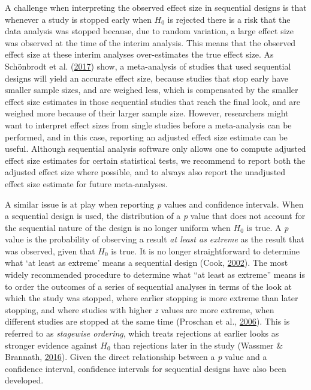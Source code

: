 \documentclass[
  english,
  ,jou, a4paper,floatsintext]{apa6}
\begin{document}
A challenge when interpreting the observed effect size in sequential designs is that whenever a study is stopped early when \(H_0\) is rejected there is a risk that the data analysis was stopped because, due to random variation, a large effect size was observed at the time of the interim analysis. This means that the observed effect size at these interim analyses over-estimates the true effect size. As Schönbrodt et al. (\protect\hyperlink{ref-schonbrodt_sequential_2017}{2017}) show, a meta-analysis of studies that used sequential designs will yield an accurate effect size, because studies that stop early have smaller sample sizes, and are weighed less, which is compensated by the smaller effect size estimates in those sequential studies that reach the final look, and are weighed more because of their larger sample size. However, researchers might want to interpret effect sizes from single studies before a meta-analysis can be performed, and in this case, reporting an adjusted effect size estimate can be useful. Although sequential analysis software only allows one to compute adjusted effect size estimates for certain statistical tests, we recommend to report both the adjusted effect size where possible, and to always also report the unadjusted effect size estimate for future meta-analyses.

A similar issue is at play when reporting \emph{p} values and confidence intervals. When a sequential design is used, the distribution of a \emph{p} value that does not account for the sequential nature of the design is no longer uniform when \(H_0\) is true. A \emph{p} value is the probability of observing a result \emph{at least as extreme} as the result that was observed, given that \(H_0\) is true. It is no longer straightforward to determine what `at least as extreme' means a sequential design (Cook, \protect\hyperlink{ref-cook_p-value_2002}{2002}). The most widely recommended procedure to determine what ``at least as extreme'' means is to order the outcomes of a series of sequential analyses in terms of the look at which the study was stopped, where earlier stopping is more extreme than later stopping, and where studies with higher \emph{z} values are more extreme, when different studies are stopped at the same time (Proschan et al., \protect\hyperlink{ref-proschan_statistical_2006}{2006}). This is referred to as \emph{stagewise ordering}, which treats rejections at earlier looks as stronger evidence against \(H_0\) than rejections later in the study (Wassmer \& Brannath, \protect\hyperlink{ref-wassmer_group_2016}{2016}). Given the direct relationship between a \emph{p} value and a confidence interval, confidence intervals for sequential designs have also been developed.
\end{document}
